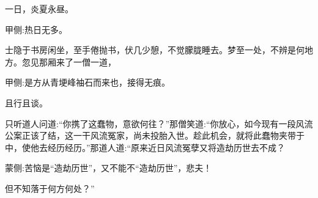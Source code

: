 \begin{parag}
    一日，炎夏永昼。\begin{note}甲侧:热日无多。\end{note}士隐于书房闲坐，至手倦抛书，伏几少憩，不觉朦胧睡去。梦至一处，不辨是何地方。忽见那厢来了一僧一道，\begin{note}甲侧:是方从青埂峰袖石而来也，接得无痕。\end{note}且行且谈。
\end{parag}


\begin{parag}
    只听道人问道:“你携了这蠢物，意欲何往？”那僧笑道:“你放心，如今现有一段风流公案正该了结，这一干风流冤家，尚未投胎入世。趁此机会，就将此蠢物夹带于中，使他去经历经历。”那道人道:“原来近日风流冤孽又将造劫历世去不成？\begin{note}蒙侧:苦恼是“造劫历世”，又不能不“造劫历世”，悲夫！\end{note}但不知落于何方何处？”
\end{parag}



